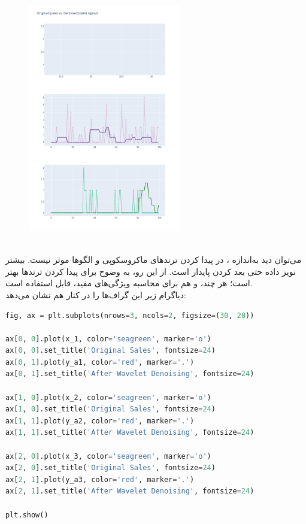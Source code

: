 \documentclass{article}
\begin{document}
\pagebreak
\begin{figure}[hbt!]
	\centering
	\includegraphics[width=\textwidth,height=10cm]{Outputs/10.png}
\end{figure}
\ \\
می‌توان دید  به‌اندازه ، در پیدا کردن ترندهای ماکروسکوپی و الگوها موثر نیست. بیشتر نویز داده حتی بعد  کردن پایدار است. از این رو،  به وضوح برای پیدا کردن ترندها بهتر است؛ هر چند،  و  هم برای محاسبه ویژگی‌های مفید، قابل استفاده است.\\
دیاگرام زیر این گراف‌ها را در کنار هم نشان می‌دهد:
\begin{latin}
\begin{lstlisting}[language=Python]
fig, ax = plt.subplots(nrows=3, ncols=2, figsize=(30, 20))

ax[0, 0].plot(x_1, color='seagreen', marker='o') 
ax[0, 0].set_title('Original Sales', fontsize=24)
ax[0, 1].plot(y_a1, color='red', marker='.') 
ax[0, 1].set_title('After Wavelet Denoising', fontsize=24)

ax[1, 0].plot(x_2, color='seagreen', marker='o') 
ax[1, 0].set_title('Original Sales', fontsize=24)
ax[1, 1].plot(y_a2, color='red', marker='.') 
ax[1, 1].set_title('After Wavelet Denoising', fontsize=24)

ax[2, 0].plot(x_3, color='seagreen', marker='o') 
ax[2, 0].set_title('Original Sales', fontsize=24)
ax[2, 1].plot(y_a3, color='red', marker='.') 
ax[2, 1].set_title('After Wavelet Denoising', fontsize=24)

plt.show()
\end{lstlisting}
\end{latin}
\end{document}
